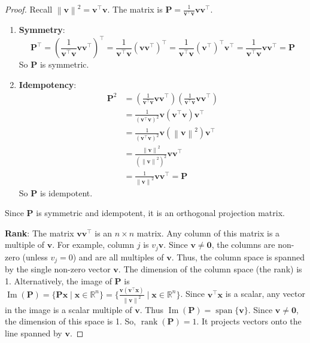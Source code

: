 \documentclass[11pt, a4paper]{article}
\DeclareMathOperator{\rank}{\mathrm{rank}}       %
\DeclareMathOperator{\Image}{\mathrm{Im}}        %
\DeclareMathOperator{\Span}{\mathrm{span}}       %
\theoremstyle{definition}
\theoremstyle{remark}
\newcommand{\RR}{\mathbb{R}}             %
\newcommand{\mat}[1]{\mathbf{#1}}       %
\newcommand{\vect}[1]{\bm{#1}}          %
\newcommand{\transpose}{^{\top}}        %
\newcommand{\norm}[1]{\left\| #1 \right\|} %
\begin{document}
\begin{proof}
Recall $\norm{\vect{v}}^2 = \vect{v}\transpose \vect{v}$. The matrix is $\mat{P} = \frac{1}{\vect{v}\transpose \vect{v}} \vect{v}\vect{v}\transpose$.
\begin{enumerate}
    \item \textbf{Symmetry}:
    \[ \mat{P}\transpose = \left( \frac{1}{\vect{v}\transpose \vect{v}} \vect{v}\vect{v}\transpose \right)\transpose = \frac{1}{\vect{v}\transpose \vect{v}} (\vect{v}\vect{v}\transpose)\transpose = \frac{1}{\vect{v}\transpose \vect{v}} (\vect{v}\transpose)\transpose \vect{v}\transpose = \frac{1}{\vect{v}\transpose \vect{v}} \vect{v}\vect{v}\transpose = \mat{P} \]
    So $\mat{P}$ is symmetric.

    \item \textbf{Idempotency}:
    \begin{align*} \mat{P}^2 &= \left( \frac{1}{\vect{v}\transpose \vect{v}} \vect{v}\vect{v}\transpose \right) \left( \frac{1}{\vect{v}\transpose \vect{v}} \vect{v}\vect{v}\transpose \right) \\ &= \frac{1}{(\vect{v}\transpose \vect{v})^2} \vect{v}(\vect{v}\transpose \vect{v})\vect{v}\transpose \\ &= \frac{1}{(\vect{v}\transpose \vect{v})^2} \vect{v}(\norm{\vect{v}}^2)\vect{v}\transpose \\ &= \frac{\norm{\vect{v}}^2}{(\norm{\vect{v}}^2)^2} \vect{v}\vect{v}\transpose \\ &= \frac{1}{\norm{\vect{v}}^2} \vect{v}\vect{v}\transpose = \mat{P} \end{align*}
    So $\mat{P}$ is idempotent.
\end{enumerate}
Since $\mat{P}$ is symmetric and idempotent, it is an orthogonal projection matrix.

\textbf{Rank}: The matrix $\vect{v}\vect{v}\transpose$ is an $n \times n$ matrix. Any column of this matrix is a multiple of $\vect{v}$. For example, column $j$ is $v_j \vect{v}$. Since $\vect{v} \neq \vect{0}$, the columns are non-zero (unless $v_j=0$) and are all multiples of $\vect{v}$. Thus, the column space is spanned by the single non-zero vector $\vect{v}$. The dimension of the column space (the rank) is 1.
Alternatively, the image of $\mat{P}$ is $\Image(\mat{P}) = \{ \mat{P}\vect{x} \mid \vect{x} \in \RR^n \} = \{ \frac{\vect{v}(\vect{v}\transpose\vect{x})}{\norm{\vect{v}}^2} \mid \vect{x} \in \RR^n \}$. Since $\vect{v}\transpose\vect{x}$ is a scalar, any vector in the image is a scalar multiple of $\vect{v}$. Thus $\Image(\mat{P}) = \Span\{\vect{v}\}$. Since $\vect{v} \neq \vect{0}$, the dimension of this space is 1.
So, $\rank(\mat{P}) = 1$. It projects vectors onto the line spanned by $\vect{v}$.
\end{proof}
\end{document}
